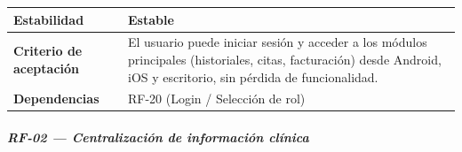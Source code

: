 \documentclass[
]{article}
\begin{document}
{\begin{longtable}[]{|
  >{\raggedright\arraybackslash}p{}|
  >{\raggedright\arraybackslash}p{}|}
\hline
\textbf{Estabilidad} & \begin{minipage}[t]{\linewidth}\raggedright
Estable
\end{minipage} \\
\hline
\textbf{Criterio de aceptación} &
\begin{minipage}[t]{\linewidth}\raggedright
El usuario puede iniciar sesión y acceder a los módulos principales (historiales, citas, facturación) desde Android, iOS y escritorio, sin pérdida de funcionalidad.
\end{minipage} \\
\hline
\textbf{Dependencias} & \begin{minipage}[t]{\linewidth}\raggedright
RF-20 (Login / Selección de rol)
\end{minipage} \\
\hline
\end{longtable}
}

\subparagraph{RF-02 --- Centralización de información clínica}\label{rf-02-centralizaci-n-de-informaci-n-cl-nica}
\end{document}
